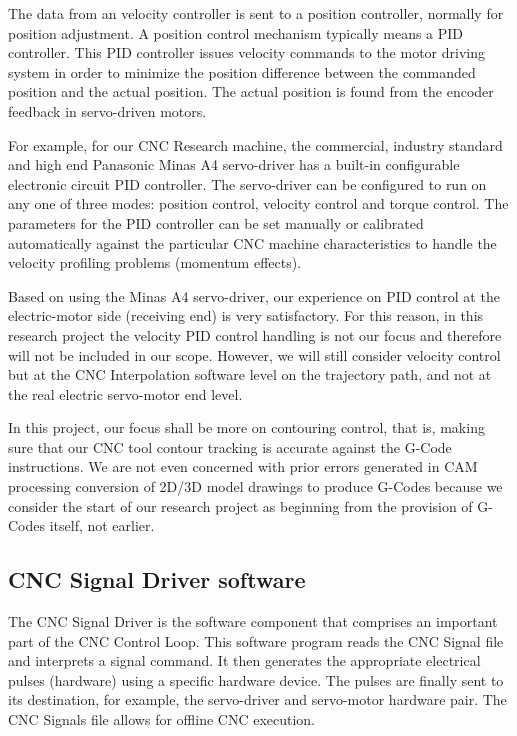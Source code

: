 The data from an velocity controller is sent to a position controller, normally for position adjustment. A position control mechanism typically means a PID controller. This PID controller issues velocity commands to the motor driving system in order to minimize the position difference between the commanded position and the actual position. The actual position is found from the encoder feedback in servo-driven motors.
\vspace*{1\baselineskip}

For example, for our CNC Research machine, the commercial, industry standard and high end Panasonic Minas A4 servo-driver has a built-in configurable electronic circuit PID controller. The servo-driver can be configured to run on any one of three modes: position control, velocity control and torque control. The parameters for the PID controller can be set manually or calibrated automatically against the particular CNC machine characteristics to handle the velocity profiling problems (momentum effects). 

\begin{tcolorbox}[colback=green!15!white,colframe=red!75!black,title=Research consideration no. 1]
\justifying
Based on using the Minas A4 servo-driver, our experience on PID control at the electric-motor side (receiving end) is very satisfactory. For this reason, in this research project the velocity PID control handling is not our focus and therefore will not be included in our scope. However, we will still consider velocity control but at the CNC Interpolation software level on the trajectory path, and not at the real electric servo-motor end level.
\vspace*{1\baselineskip}

In this project, our focus shall be more on contouring control, that is, making sure that our CNC tool contour tracking is accurate against the G-Code instructions. We are not even concerned with prior errors generated in CAM processing conversion of 2D/3D model drawings to produce G-Codes because we consider the start of our research project as beginning from the provision of G-Codes itself, not earlier.
\end{tcolorbox}

\subsection{CNC Signal Driver software} 

The CNC Signal Driver is the software component that comprises an important part of the CNC Control Loop. This software program  reads the CNC Signal file and interprets a signal command. It then generates the appropriate electrical pulses (hardware) using a specific hardware device. The pulses are finally sent to its destination, for example, the servo-driver and servo-motor hardware pair. The CNC Signals file allows for offline CNC execution.
\vspace*{1\baselineskip}

